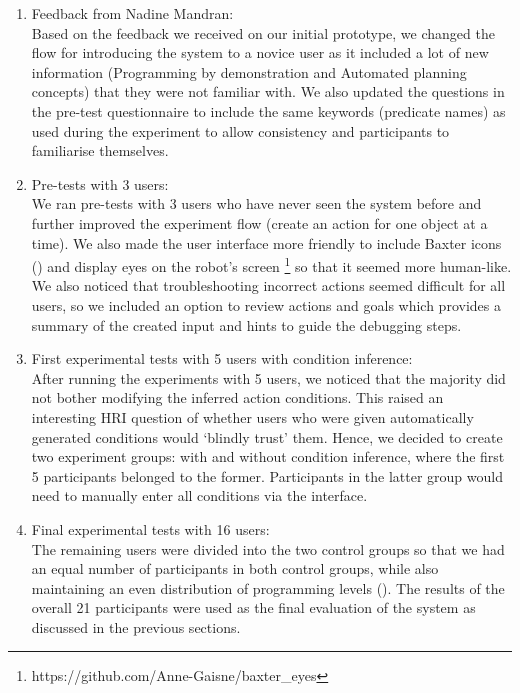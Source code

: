 \begin{enumerate}
	\item {Feedback from Nadine Mandran:\\
		Based on the feedback we received on our initial prototype, we changed the flow for introducing the system to a novice user as it included a lot of new information (\eg Programming by demonstration and Automated planning concepts) that they were not familiar with.
		We also updated the questions in the pre-test questionnaire to include the same keywords (\ie predicate names) as used during the experiment to allow consistency and participants to familiarise themselves.
	}
	\item {Pre-tests with 3 users:\\
		We ran pre-tests with 3 users who have never seen the system before and further improved the experiment flow (\eg create an action for one object at a time).
		We also made the user interface more friendly to include Baxter icons () and display eyes on the robot's screen \footnote{https://github.com/Anne-Gaisne/baxter_eyes} so that it seemed more human-like.
		We also noticed that troubleshooting incorrect actions seemed difficult for all users, so we included an option to review actions and goals which provides a summary of the created input and hints to guide the debugging steps.}
	\item {First experimental tests with 5 users with condition inference:\\
		After running the experiments with 5 users, we noticed that the majority did not bother modifying the inferred action conditions.
		This raised an interesting HRI question of whether users who were given automatically generated conditions would `blindly trust' them.
		Hence, we decided to create two experiment groups: with and without condition inference, where the first 5 participants belonged to the former.
		Participants in the latter group would need to manually enter all conditions via the interface. }
	\item {Final experimental tests with 16 users: \\
		The remaining users were divided into the two control groups so that we had an equal number of participants in both control groups, while also maintaining an even distribution of programming levels ().
		The results of the overall 21 participants were used as the final evaluation of the system as discussed in the previous sections.
	}
\end{enumerate}


